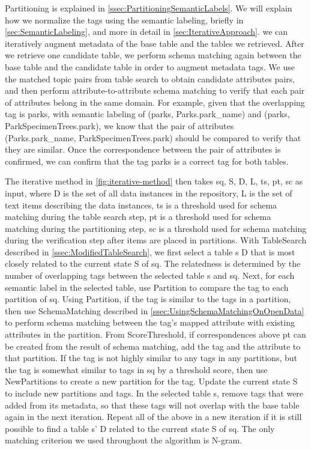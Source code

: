 Partitioning is explained in \autoref{ssec:PartitioningSemanticLabels}.
We will explain how we normalize the tags using the semantic labeling, briefly in \autoref{sec:SemanticLabeling}, and more in detail in \autoref{sec:IterativeApproach}.
we can iteratively augment metadata of the base table and the tables we retrieved.
After we retrieve one candidate table, we perform schema matching again between the base table and the candidate table in order to augment metadata tags. We use the matched topic pairs from table search to obtain candidate attributes pairs, and then perform attribute-to-attribute schema matching to verify that each pair of attributes belong in the same domain. For example, given that the overlapping tag is parks, with semantic labeling of (parks, Parks.park\_name) and (parks, ParkSpecimenTrees.park), we know that the pair of attributes (Parks.park\_name, ParkSpecimenTrees.park) should be compared to verify that they are similar. Once the correspondence between the pair of attributes is confirmed, we can confirm that the tag parks is a correct tag for both tables.

The iterative method in \autoref{fig:iterative-method} then takes sq, S, D, L, ts, pt, sc as input, where D is the set of all data instances in the repository, L is the set of text items describing the data instances, ts is a threshold used for schema matching during the table search step, pt is a threshold used for schema matching during the partitioning step, sc is a threshold used for schema matching during the verification step after items are placed in partitions.
With TableSearch described in \autoref{ssec:ModifiedTableSearch}, we first select a table s  D that is most closely related to the current state S of sq. The relatedness is determined by the number of overlapping tags between the selected table s and sq. Next, for each semantic label in the selected table, use Partition to compare the tag to each partition of sq. Using Partition, if the tag is similar to the tags in a partition, then use SchemaMatching described in \autoref{ssec:UsingSchemaMatchingOnOpenData} to perform schema matching between the tag's mapped attribute with existing attributes in the partition. From ScoreThreshold, if correspondences above pt can be created from the result of schema matching, add the tag and the attribute to that partition. If the tag is not highly similar to any tags in any partitions, but the tag is somewhat similar to tags in sq by a threshold score, then use NewPartitions to create a new partition for the tag. Update the current state S to include new partitions and tags. In the selected table s, remove tags that were added from its metadata, so that these tags will not overlap with the base table again in the next iteration. Repeat all of the above in a new iteration if it is still possible to find a table s'  D related to the current state S of sq. The only matching criterion we used throughout the algorithm is N-gram.

